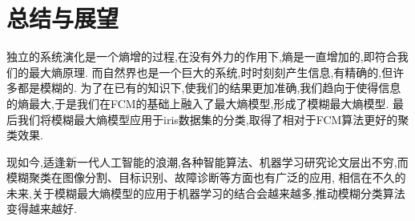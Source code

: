 \chapter{总结与展望}
\par 
独立的系统演化是一个熵增的过程,在没有外力的作用下,熵是一直增加的,即符合我们的最大熵原理.
而自然界也是一个巨大的系统,时时刻刻产生信息,有精确的,但许多都是模糊的.
为了在已有的知识下,使我们的结果更加准确,我们趋向于使得信息的熵最大,于是我们在FCM的基础上融入了最大熵模型,形成了模糊最大熵模型.
最后我们将模糊最大熵模型应用于iris数据集的分类,取得了相对于FCM算法更好的聚类效果.
\par
现如今,适逢新一代人工智能的浪潮,各种智能算法、机器学习研究论文层出不穷,而模糊聚类在图像分割、目标识别、故障诊断等方面也有广泛的应用,
相信在不久的未来,关于模糊最大熵模型的应用于机器学习的结合会越来越多,推动模糊分类算法变得越来越好.